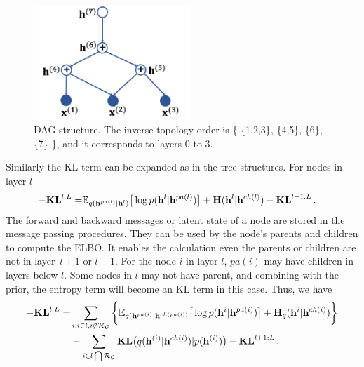 \documentclass{article} %
\begin{document}
\begin{figure}[!htbp]
    \centering
    \includegraphics[width=2.3in]{fig/dag.png}
    \caption{DAG structure. The inverse topology order is \big\{ \{1,2,3\}, \{4,5\}, \{6\},  \{7\} \big\}, and it corresponds to layers 0 to 3.  }
    \label{fig:dag}
\end{figure}

Similarly the KL term can be expanded as in the tree structures. For nodes in layer $l$
\begin{align} \label{eq:KL_dag1}
-\textbf{\text{KL}}^{l:L} 
=&     \mathbb{E}_{q(\mathbf{h}^{pa(l)}|\mathbf{h}^l)} \big[ \log  p( \mathbf{h}^{l}|  \mathbf{h}^{pa(l)})    \big]  +  \textbf{\text{H}}(\mathbf{h}^{l}|\mathbf{h}^{ch(l)})  - \textbf{\text{KL}}^{l+1:L} \, .
\end{align}
The forward and backward messages or latent state of a node are stored in the message passing procedures. They can be used by the node's parents and children  to compute the ELBO.  
It enables the calculation even the parents or children are  not  in layer~$l+1$ or $l-1$. For the node $i$ in layer $l$,   $pa(i)$ may have children in layers below $l$. Some nodes in $l$ may not have parent, and combining with the prior, the entropy term will become an KL term in this case.  Thus,  we have 
\begin{align} \label{eq:KL_dag2}
-\textbf{\text{KL}}^{l:L} = &  \sum_{i:i\in l, i \not\in   \mathcal{R}_{ \mathcal{G}} }  \bigg\{ \mathbb{E}_{q(\mathbf{h}^{pa(i)}|\mathbf{h}^{ch(pa(i))}} \big[ \log p( \mathbf{h}^{i}|  \mathbf{h}^{pa(i)})    \big]   +  \textbf{\text{H}}_q(\mathbf{h}^{i}|\mathbf{h}^{ch(i)})  \bigg\}  \\ \notag
& -  \sum_{i \in l \bigcap \mathcal{R}_{ \mathcal{G} }  }  \textbf{\text{KL}}\big(q(\mathbf{h}^{(i)} | \mathbf{h}^{ch(i)} )   | p(\mathbf{h}^{(i)})  \big)  - \textbf{\text{KL}}^{l+1:L} \, .\notag
\end{align}
\end{document}
